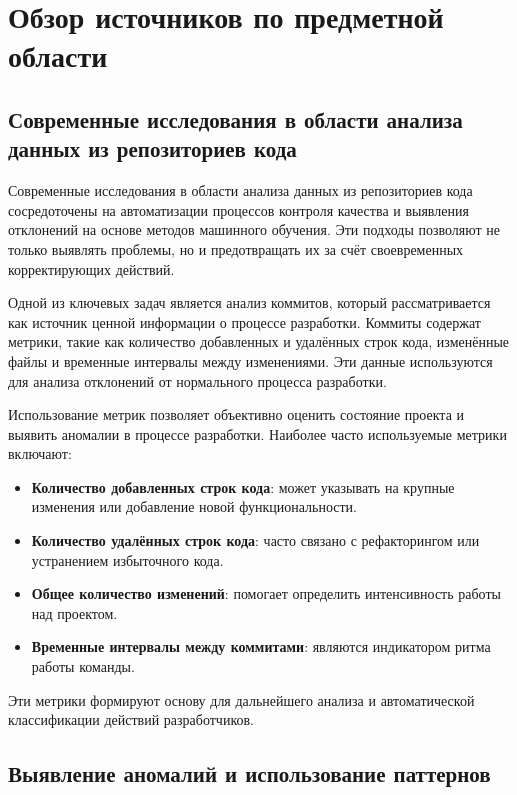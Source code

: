 \chapter{Обзор источников по предметной области} \label{ch1}

\section{Современные исследования в области анализа данных из репозиториев кода} \label{ch1:sec1}

Современные исследования в области анализа данных из репозиториев кода сосредоточены на автоматизации процессов контроля качества и выявления отклонений на основе методов машинного обучения. Эти подходы позволяют не только выявлять проблемы, но и предотвращать их за счёт своевременных корректирующих действий.

Одной из ключевых задач является анализ коммитов, который рассматривается как источник ценной информации о процессе разработки. Коммиты содержат метрики, такие как количество добавленных и удалённых строк кода, изменённые файлы и временные интервалы между изменениями. Эти данные используются для анализа отклонений от нормального процесса разработки.

Использование метрик позволяет объективно оценить состояние проекта и выявить аномалии в процессе разработки. Наиболее часто используемые метрики включают:
\begin{itemize}
	\item \textbf{Количество добавленных строк кода}: может указывать на крупные изменения или добавление новой функциональности.
	\item \textbf{Количество удалённых строк кода}: часто связано с рефакторингом или устранением избыточного кода.
	\item \textbf{Общее количество изменений}: помогает определить интенсивность работы над проектом.
	\item \textbf{Временные интервалы между коммитами}: являются индикатором ритма работы команды.
\end{itemize}

Эти метрики формируют основу для дальнейшего анализа и автоматической классификации действий разработчиков.

\section{Выявление аномалий и использование паттернов} \label{ch1:sec2}


